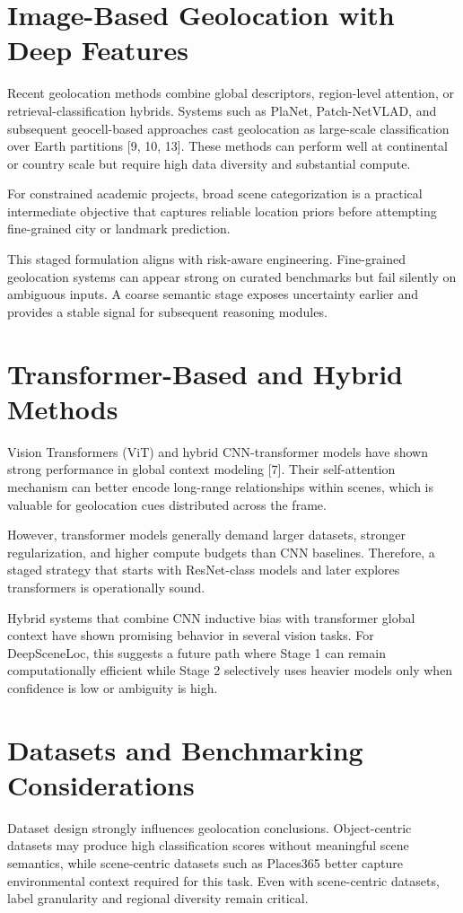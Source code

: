 \section{Image-Based Geolocation with Deep Features}
Recent geolocation methods combine global descriptors, region-level attention, or retrieval-classification hybrids. Systems such as PlaNet, Patch-NetVLAD, and subsequent geocell-based approaches cast geolocation as large-scale classification over Earth partitions [9, 10, 13]. These methods can perform well at continental or country scale but require high data diversity and substantial compute.

For constrained academic projects, broad scene categorization is a practical intermediate objective that captures reliable location priors before attempting fine-grained city or landmark prediction.

This staged formulation aligns with risk-aware engineering. Fine-grained geolocation systems can appear strong on curated benchmarks but fail silently on ambiguous inputs. A coarse semantic stage exposes uncertainty earlier and provides a stable signal for subsequent reasoning modules.

\section{Transformer-Based and Hybrid Methods}
Vision Transformers (ViT) and hybrid CNN-transformer models have shown strong performance in global context modeling [7]. Their self-attention mechanism can better encode long-range relationships within scenes, which is valuable for geolocation cues distributed across the frame.

However, transformer models generally demand larger datasets, stronger regularization, and higher compute budgets than CNN baselines. Therefore, a staged strategy that starts with ResNet-class models and later explores transformers is operationally sound.

Hybrid systems that combine CNN inductive bias with transformer global context have shown promising behavior in several vision tasks. For DeepSceneLoc, this suggests a future path where Stage 1 can remain computationally efficient while Stage 2 selectively uses heavier models only when confidence is low or ambiguity is high.

\section{Datasets and Benchmarking Considerations}
Dataset design strongly influences geolocation conclusions. Object-centric datasets may produce high classification scores without meaningful scene semantics, while scene-centric datasets such as Places365 better capture environmental context required for this task. Even with scene-centric datasets, label granularity and regional diversity remain critical.


